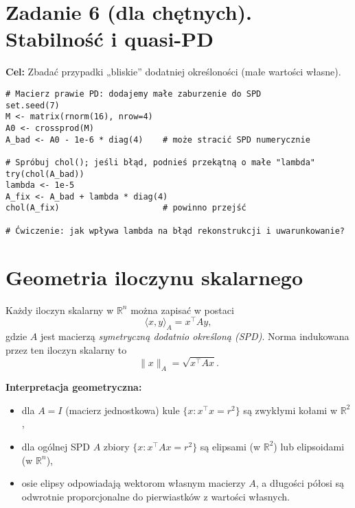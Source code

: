 \documentclass[12pt]{article}
\begin{document}
\section*{Zadanie 6 (dla chętnych). Stabilność i quasi-PD}
\textbf{Cel:} Zbadać przypadki „bliskie” dodatniej określoności (małe wartości własne).

\begin{lstlisting}
# Macierz prawie PD: dodajemy małe zaburzenie do SPD
set.seed(7)
M <- matrix(rnorm(16), nrow=4)
A0 <- crossprod(M)
A_bad <- A0 - 1e-6 * diag(4)    # może stracić SPD numerycznie

# Spróbuj chol(); jeśli błąd, podnieś przekątną o małe "lambda"
try(chol(A_bad))
lambda <- 1e-5
A_fix <- A_bad + lambda * diag(4)
chol(A_fix)                     # powinno przejść

# Ćwiczenie: jak wpływa lambda na błąd rekonstrukcji i uwarunkowanie?
\end{lstlisting}


\section*{Geometria iloczynu skalarnego}

Każdy iloczyn skalarny w $\mathbb{R}^n$ można zapisać w postaci
\[
\langle x,y \rangle_A = x^\top A y,
\]
gdzie $A$ jest macierzą \emph{symetryczną dodatnio określoną (SPD)}.
Norma indukowana przez ten iloczyn skalarny to
\[
\|x\|_A = \sqrt{x^\top A x}.
\]

\textbf{Interpretacja geometryczna:} 
\begin{itemize}
  \item dla $A=I$ (macierz jednostkowa) kule $\{x : x^\top x = r^2\}$ są zwykłymi kołami w $\mathbb{R}^2$,
  \item dla ogólnej SPD $A$ zbiory $\{x : x^\top A x = r^2\}$ są elipsami (w $\mathbb{R}^2$) lub elipsoidami (w $\mathbb{R}^n$),
  \item osie elipsy odpowiadają wektorom własnym macierzy $A$, a długości półosi są odwrotnie proporcjonalne do pierwiastków z wartości własnych.
\end{itemize}

\begin{center}
\end{center}
\end{document}
